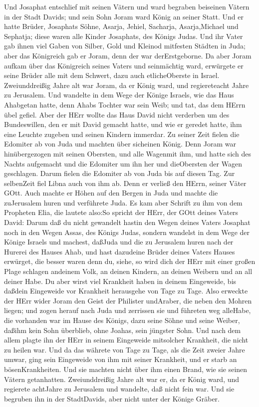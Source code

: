  Und Josaphat entschlief mit seinen Vätern und ward begraben
beiseinen Vätern in der Stadt Davids; und sein Sohn Joram ward König an
seiner Statt.  Und er hatte Brüder, Josaphats Söhne, Asarja,
Jehiel, Sacharja, Asarja,Michael und Sephatja; diese waren alle Kinder
Josaphats, des Königs Judas.  Und ihr Vater gab ihnen viel
Gaben von Silber, Gold und Kleinod mitfesten Städten in Juda; aber das
Königreich gab er Joram, denn der war derErstgeborne.  Da
aber Joram aufkam über das Königreich seines Vaters und seinmächtig
ward, erwürgete er seine Brüder alle mit dem Schwert, dazu auch
etlicheOberste in Israel.  Zweiunddreißig Jahre alt war
Joram, da er König ward, und regiereteacht Jahre zu Jerusalem.
 Und wandelte in dem Wege der Könige Israels, wie das Haus
Ahabgetan hatte, denn Ahabs Tochter war sein Weib; und tat, das dem
HErrn übel gefiel.  Aber der HErr wollte das Haus David
nicht verderben um des Bundeswillen, den er mit David gemacht hatte, und
wie er geredet hatte, ihm eine Leuchte zugeben und seinen Kindern
immerdar.  Zu seiner Zeit fielen die Edomiter ab von Juda
und machten über sicheinen König.  Denn Joram war
hinübergezogen mit seinen Obersten, und alle Wagenmit ihm, und hatte
sich des Nachts aufgemacht und die Edomiter um ihn her und dieObersten
der Wagen geschlagen.  Darum fielen die Edomiter ab von
Juda bis auf diesen Tag. Zur selbenZeit fiel Libna auch von ihm ab. Denn
er verließ den HErrn, seiner Väter GOtt.  Auch machte er
Höhen auf den Bergen in Juda und machte die zuJerusalem huren und
verführete Juda.  Es kam aber Schrift zu ihm von dem
Propheten Elia, die lautete also:So spricht der HErr, der GOtt deines
Vaters David: Darum daß du nicht gewandelt hastin den Wegen deines
Vaters Josaphat noch in den Wegen Assas, des Königs Judas, 
sondern wandelst in dem Wege der Könige Israels und machest, daßJuda und
die zu Jerusalem huren nach der Hurerei des Hauses Ahab, und hast
dazudeine Brüder deines Vaters Hauses erwürget, die besser waren denn
du,  siehe, so wird dich der HErr mit einer großen Plage
schlagen andeinem Volk, an deinen Kindern, an deinen Weibern und an all
deiner Habe.  Du aber wirst viel Krankheit haben in deinem
Eingeweide, bis daßdein Eingeweide vor Krankheit herausgehe von Tage zu
Tage.  Also erweckte der HErr wider Joram den Geist der
Philister undAraber, die neben den Mohren liegen;  und
zogen herauf nach Juda und zerrissen sie und führeten weg alleHabe, die
vorhanden war im Hause des Königs, dazu seine Söhne und seine Weiber,
daßihm kein Sohn überblieb, ohne Joahas, sein jüngster Sohn.
 Und nach dem allem plagte ihn der HErr in seinem
Eingeweide mitsolcher Krankheit, die nicht zu heilen war. 
Und da das währete von Tage zu Tage, als die Zeit zweier Jahre umwar,
ging sein Eingeweide von ihm mit seiner Krankheit, und er starb an
bösenKrankheiten. Und sie machten nicht über ihm einen Brand, wie sie
seinen Vätern getanhatten.  Zweiunddreißig Jahre alt war
er, da er König ward, und regierete achtJahre zu Jerusalem und wandelte,
daß nicht fein war. Und sie begruben ihn in der StadtDavids, aber nicht
unter der Könige Gräber.

